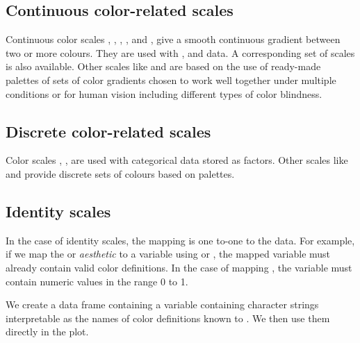 \documentclass[krantz2]{krantz}\usepackage{knitr}
\begin{document}
\subsection{Continuous color-related scales}
\sloppy
Continuous color scales , , ,  ,  and , give a smooth continuous gradient between two or more colours. They are used with ,  and  data. A corresponding set of  scales is also available. Other scales like  and  are based on the use of ready-made palettes of sets of color gradients chosen to work well together under multiple conditions or for human vision including different types of color blindness.

\subsection{Discrete color-related scales}
\sloppy
Color scales , ,  are used with categorical data stored as factors. Other scales like  and  provide discrete sets of colours based on palettes.

\subsection{Identity scales}
In the case of identity scales, the mapping is one to-one to the data. For example, if we map the  or  \emph{aesthetic} to a variable using  or , the mapped variable must already contain valid color definitions. In the case of mapping , the variable must contain numeric values in the range 0 to 1.

We create a data frame containing a variable  containing character strings interpretable as the names of color definitions known to \Rlang. We then use them directly in the plot.
\end{document}

